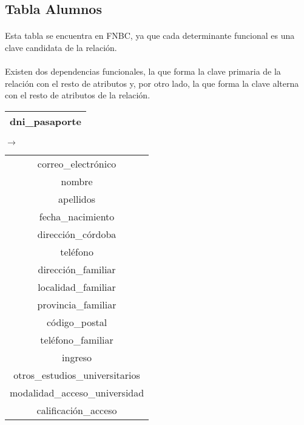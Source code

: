 \subsection{Tabla Alumnos}

  \paragraph{}Esta tabla se encuentra en FNBC, ya que cada determinante
  funcional es una clave candidata de la relación.

  \paragraph{}Existen dos dependencias funcionales, la que forma la clave
  primaria de la relación con el resto de atributos y, por otro lado, la que
  forma la clave alterna con el resto de atributos de la relación.

  \begin{center}
    \begin{minipage}{3.7cm}{\begin{flushright}\begin{tabular}{ | c | }
                  \hline
                  dni\_pasaporte \\
                  \hline
                 \end{tabular}\end{flushright} }
    \end{minipage}
    \begin{minipage}{0.7cm}{$\longrightarrow$}
    \end{minipage}
    \begin{minipage}{5.9cm}{\begin{tabular}{ | c | }
                  \hline
                  correo\_electrónico \\
                  nombre \\
                  apellidos \\
                  fecha\_nacimiento \\
                  dirección\_córdoba \\
                  teléfono \\
                  dirección\_familiar \\
                  localidad\_familiar \\
                  provincia\_familiar \\
                  código\_postal \\
                  teléfono\_familiar \\
                  ingreso \\
                  otros\_estudios\_universitarios \\
                  modalidad\_acceso\_universidad \\
                  calificación\_acceso \\
                  \hline
                 \end{tabular} }
    \end{minipage}
  \end{center}

